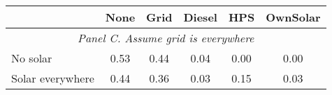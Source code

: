 \begin{table}[htbp]\centering
\begin{tabular}{l*{5}{c}}
\toprule
                 &        None&        Grid&      Diesel&         HPS&    OwnSolar\\
\midrule

\multicolumn{6}{c}{\emph{Panel C. Assume grid is everywhere}} \\
No solar         &     \cellcolor{yellow}   0.53&        0.44&        0.04&      \cellcolor{yellow}  0.00&       \cellcolor{yellow} 0.00\\
Solar everywhere &     \cellcolor{yellow}   0.44&        0.36&        0.03&    \cellcolor{yellow}    0.15&       \cellcolor{yellow} 0.03\\

\bottomrule
\end{tabular}
\end{table}

